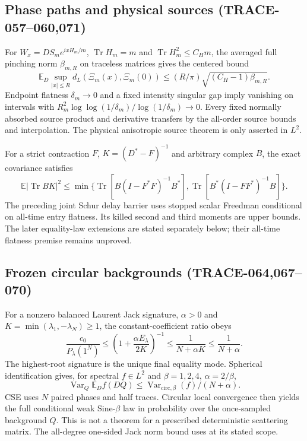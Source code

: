 \subsection{Phase paths and physical sources (TRACE-057--060,071)}
For $W_x=DS_me^{ixH_m/m}$, $\operatorname{Tr}H_m=m$ and
$\operatorname{Tr}H_m^2\le C_Hm$, the averaged full pinching norm
$\beta_{m,R}$ on traceless matrices gives the centered bound
\[
 \mathbb E_D\sup_{|x|\le R}d_L(\Xi_m(x),\Xi_m(0))
 \le (R/\pi)\sqrt{(C_H-1)\beta_{m,R}}.
\]
Endpoint flatness $\delta_m\to0$ and a fixed intensity singular gap imply
vanishing on intervals with
$R_m^2\log\log(1/\delta_m)/\log(1/\delta_m)\to0$.
Every fixed normally absorbed source product and derivative transfers by
the all-order source bounds and interpolation. The physical anisotropic
source theorem is only asserted in $L^2$.

For a strict contraction $F$, $K=(D^*-F)^{-1}$ and arbitrary complex $B$,
the exact covariance satisfies
\[
 \mathbb E|\operatorname{Tr}BK|^2
 \le\min\{\operatorname{Tr}[B(I-F^*F)^{-1}B^*],
          \operatorname{Tr}[B^*(I-FF^*)^{-1}B]\}.
\]
The preceding joint Schur delay barrier uses stopped scalar Freedman
\cite{Tropp2011} conditional on all-time entry flatness. Its killed
second and third moments are upper bounds. The later equality-law extensions
are stated separately below; their all-time flatness premise remains unproved.

\subsection{Frozen circular backgrounds (TRACE-064,067--070)}
For a nonzero balanced Laurent Jack signature, $\alpha>0$ and
$K=\min(\lambda_1,-\lambda_N)\ge1$, the constant-coefficient ratio obeys
\[
 \frac{c_0}{P_\lambda(1^N)}\le
 \left(1+\frac{\alpha E_\lambda}{2K}\right)^{-1}
 \le\frac1{N+\alpha K}\le\frac1{N+\alpha}.
\]
The highest-root signature is the unique final equality mode. Spherical
identification \cite{OO1997,Matsumoto2007} gives, for spectral
$f\in L^2$ and $\beta=1,2,4$, $\alpha=2/\beta$,
\[
 \operatorname{Var}_Q\mathbb E_D f(DQ)
 \le \operatorname{Var}_{\mathrm{circ},\beta}(f)/(N+\alpha).
\]
CSE uses $N$ paired phases and half traces. Circular local convergence
\cite{VV2017} then yields the full conditional weak Sine-$\beta$ law
in probability over the once-sampled background $Q$. This is not a theorem
for a prescribed deterministic scattering matrix. The all-degree one-sided
Jack norm bound uses \cite{JM2015} at its stated scope.

